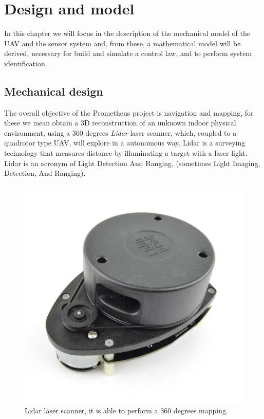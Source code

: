 \chapter{Design and model}
\label{designModel}

In this chapter we will focus in the description of the mechanical model of the UAV and the sensor system and, from these, a mathematical model will be derived, necessary for build and simulate a control law, and to perform system identification.

\section{Mechanical design}
\label{mechanicalDesign}

The overall objective of the Prometheus project is navigation and mapping, for these we mean obtain a 3D reconstruction of an unknown indoor physical environment, using a 360 degrees \textit{Lidar} laser scanner, which, coupled to a quadrotor type UAV, will explore in a autonomous way. Lidar is a surveying technology that measures distance by illuminating a target with a laser light. Lidar is an acronym of Light Detection And Ranging, (sometimes Light Imaging, Detection, And Ranging). 

\begin{figure}
	\includegraphics[scale=0.21]{images/lidar_laser.jpg}
	\caption{Lidar laser scanner, it is able to perform a 360 degrees mapping.}
	\label{fig:lidar}
\end{figure}

